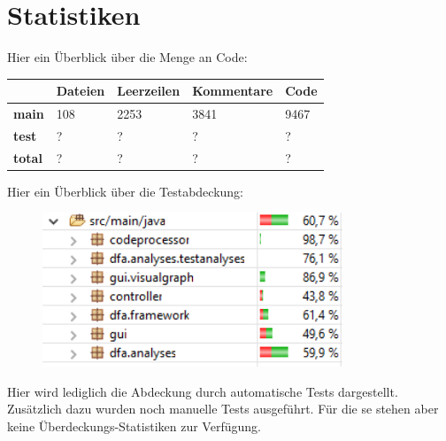 \part{Statistiken}

Hier ein Überblick über die Menge an Code: 
\begin{center}
	\begin{tabular}{ | l | l | l | l | l |}
		\hline
		& Dateien & Leerzeilen & Kommentare & Code \\ \hline
		\textbf{main} & 108 & 2253 & 3841 & 9467 \\ \hline
		\textbf{test} & ?   & ? & ?  & ? \\ \hline
		\textbf{total} & ? & ? & ? & ? \\ \hline
	\end{tabular}
\end{center}

Hier ein Überblick über die Testabdeckung:

\begin{figure}[H]
	\centering
	\includegraphics[width=0.8\textwidth]{Statistiken/coverage.png}
	\label{fig1}
\end{figure}


Hier wird lediglich die Abdeckung durch automatische Tests dargestellt. Zusätzlich dazu wurden noch manuelle Tests ausgeführt. Für die se stehen aber keine Überdeckungs-Statistiken zur Verfügung.